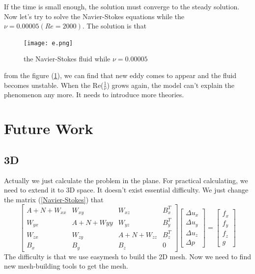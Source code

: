 \documentclass[a4paper]{article}
\begin{document}
If the time is small enough, the solution must converge to the steady solution. Now let's try to solve the Navier-Stokes equations while the $\nu=0.00005(Re=2000)$. The solution is that
\begin{figure}[h]
\centering
\texttt{[image: e.png]}
\caption{the Navier-Stokes fluid while $\nu=0.00005$}
\label{im::d}
\end{figure}
from the figure (\ref{im::d}), we can find that new eddy comes to appear and the fluid becomes unstable. When the Re($\frac{1}{\nu}$) grows again, the model can't explain the phenomenon any more. It needs to introduce more theories.
\section{Future Work}
\subsection{3D}
Actually we just calculate the problem in the plane. For practical calculating, we need to extend it to 3D space. It doesn't exist essential difficulty. We just change the matrix (\ref{Navier-Stokes}) that
\begin{equation}
\left[ \begin{array}{cccc}
A + N +W_{xx} & W_{xy} & W_{xz} & B_x^T \\
W_{yx} & A +N +W{yy}& W_{yz} & B_y^T \\
W_{zx} & W_{zy}  &A + N + W_{zz} & B_z^T \\
B_x & B_y &B_z& 0
\end{array}
\right]
\left[\begin{array}{cccc}
\Delta u_x\\
\Delta u_y\\
\Delta u_z\\
\Delta p
\end{array}
\right]=
\left[\begin{array}{cccc}
f_x\\
f_y\\
f_z\\
g
\end{array}
\right]
\label{3D-Navier-Stokes}
\end{equation}
The difficulty is that we use easymesh to build the 2D mesh. Now we need to find new mesh-building tools to get the mesh.
\end{document}
